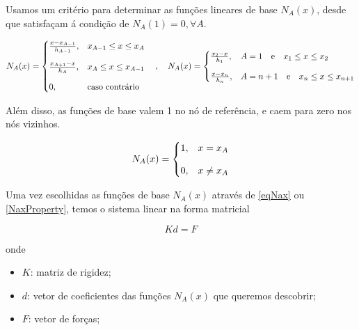 \documentclass[12pt]{scrartcl}
\begin{document}
Usamos um critério para determinar as funções lineares de base $N_A(x)$, desde que satisfaçam á condição de $N_A(1) = 0, \forall A$.

\begin{equation}\label{eqNax}
    N_A(x) =
    \begin{cases}
        \frac{x - x_{A-1}}{h_{A-1}}, & x_{A-1} \leq x \leq x_A   \\
        \noalign{\vskip9pt}
        \frac{x_{A+1} - x}{h_{A}},   & x_{A} \leq x \leq x_{A-1} \\
        \noalign{\vskip9pt}
        0,                           & \textrm{caso contrário}
    \end{cases}
    \quad , \quad
    N_A(x) =
    \begin{cases}
        \frac{x_2 - x}{h_1}, & A = 1 \quad \textrm{e} \quad x_{1} \leq x \leq x_2       \\
        \noalign{\vskip9pt}
        \frac{x - x_n}{h_n}, & A = n+1 \quad \textrm{e} \quad x_{n} \leq x \leq x_{n+1}
    \end{cases}
\end{equation}

Além disso, as funções de base valem 1 no nó de referência, e caem para zero nos nós vizinhos.

\begin{equation}\label{NaxProperty}
    N_A(x) = \begin{cases}
        1, & x = x_A    \\
        \noalign{\vskip9pt}
        0, & x \neq x_A \\
    \end{cases}
\end{equation}

Uma vez escolhidas as funções de base $N_A(x)$ através de \eqref{eqNax} ou \eqref{NaxProperty}, temos o sistema linear na forma matricial

\begin{equation}\label{eqkdf}
    Kd = F
\end{equation}

onde

\begin{itemize}
    \item $K$: matriz de rigidez;
    \item $d$: vetor de coeficientes das funções $N_A(x)$ que queremos descobrir;
    \item $F$: vetor de forças;
\end{itemize}
\end{document}
